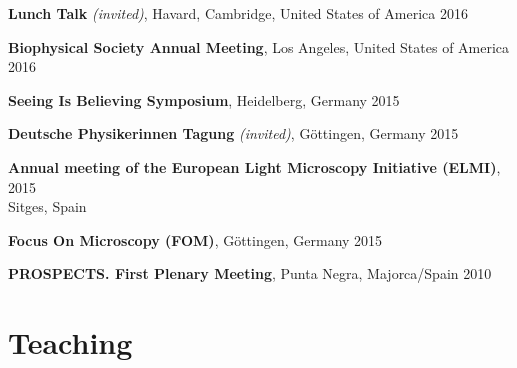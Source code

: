 \documentclass[margin,line]{res}
\begin{document}
\begin{resume}
\vspace*{-2.5mm}
{\bf Lunch Talk} {\it (invited)}, Havard, Cambridge, United States of America \hfill 2016%

\vspace*{-2.5mm}
{\bf Biophysical Society Annual Meeting}, Los Angeles, United States of America \hfill 2016%

\vspace*{-2.5mm}
{\bf Seeing Is Believing Symposium}, Heidelberg, Germany \hfill 2015%

\vspace*{-2.5mm}
{\bf Deutsche Physikerinnen Tagung} {\it (invited)}, Göttingen, Germany \hfill 2015%

\vspace*{-2.5mm}
{\bf Annual meeting of the European Light Microscopy Initiative (ELMI)},  \hfill 2015\\Sitges, Spain%

\vspace*{-2.5mm}
{\bf Focus On Microscopy (FOM)}, Göttingen, Germany  \hfill 2015%

\vspace*{-2.5mm}
{\bf PROSPECTS. First Plenary Meeting}, Punta Negra, Majorca/Spain  \hfill 2010 %


\section{\sc Teaching}


\end{resume}
\end{document}
